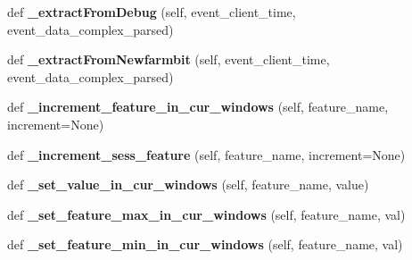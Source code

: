 \begin{DoxyCompactItemize}
def {\bfseries \+\_\+extract\+From\+Debug} (self, event\+\_\+client\+\_\+time, event\+\_\+data\+\_\+complex\+\_\+parsed)
\item 
\mbox{\label{classfeature__extractors_1_1_lakeland_extractor_1_1_lakeland_extractor_ac43b697ca415fc0bd63537776a791e03}} 
def {\bfseries \+\_\+extract\+From\+Newfarmbit} (self, event\+\_\+client\+\_\+time, event\+\_\+data\+\_\+complex\+\_\+parsed)
\item 
\mbox{\label{classfeature__extractors_1_1_lakeland_extractor_1_1_lakeland_extractor_a251ddfe4e65b04fc091176f2e403a45b}} 
def {\bfseries \+\_\+increment\+\_\+feature\+\_\+in\+\_\+cur\+\_\+windows} (self, feature\+\_\+name, increment=None)
\item 
\mbox{\label{classfeature__extractors_1_1_lakeland_extractor_1_1_lakeland_extractor_a3558cc461a96e3d01c25863729265216}} 
def {\bfseries \+\_\+increment\+\_\+sess\+\_\+feature} (self, feature\+\_\+name, increment=None)
\item 
\mbox{\label{classfeature__extractors_1_1_lakeland_extractor_1_1_lakeland_extractor_aba367d6b31c33877143af2e277d1ee09}} 
def {\bfseries \+\_\+set\+\_\+value\+\_\+in\+\_\+cur\+\_\+windows} (self, feature\+\_\+name, value)
\item 
\mbox{\label{classfeature__extractors_1_1_lakeland_extractor_1_1_lakeland_extractor_a0dccf2a0d38928ea312b1ae25b42dec7}} 
def {\bfseries \+\_\+set\+\_\+feature\+\_\+max\+\_\+in\+\_\+cur\+\_\+windows} (self, feature\+\_\+name, val)
\item 
\mbox{\label{classfeature__extractors_1_1_lakeland_extractor_1_1_lakeland_extractor_aa7d018ca78359db7f286416f54124e64}} 
def {\bfseries \+\_\+set\+\_\+feature\+\_\+min\+\_\+in\+\_\+cur\+\_\+windows} (self, feature\+\_\+name, val)
\item 
\mbox{\label{classfeature__extractors_1_1_lakeland_extractor_1_1_lakeland_extractor_a913fc89222ea35419b348b86860b1467}} 

\end{DoxyCompactItemize}
